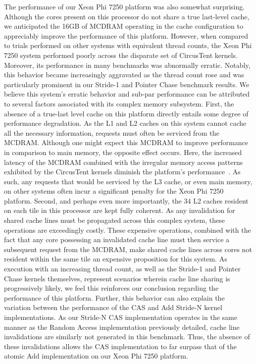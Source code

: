 The performance of our Xeon Phi 7250 platform was also somewhat surprising.
Although the cores present on this processor do not share a true last-level cache, we anticipated the 16GB of MCDRAM operating in the cache configuration to appreciably improve the performance of this platform.
However, when compared to trials performed on other systems with equivalent thread counts, the Xeon Phi 7250 system performed poorly across the disparate set of CircusTent kernels.
Moreover, its performance in many benchmarks was abnormally erratic.
Notably, this behavior became increasingly aggravated as the thread count rose and was particularly prominent in our Stride-1 and Pointer Chase benchmark results.
We believe this system's erratic behavior and sub-par performance can be attributed to several factors associated with its complex memory subsystem.
First, the absence of a true-last level cache on this platform directly entails some degree of performance degradation.
As the L1 and L2 caches on this system cannot cache all the necessary information, requests must often be serviced from the MCDRAM.
Although one might expect this MCDRAM to improve performance in comparison to main memory, the opposite effect occurs.
Here, the increased latency of the MCDRAM combined with the irregular memory access patterns exhibited by the CircusTent kernels diminish the platform's performance~\cite{peng2017exploring}.
As such, any requests that would be serviced by the L3 cache, or even main memory, on other systems often incur a significant penalty for the Xeon Phi 7250 platform.
Second, and perhaps even more importantly, the 34 L2 caches resident on each tile in this processor are kept fully coherent.
As any invalidation for shared cache lines must be propagated across this complex system, these operations are exceedingly costly.
These expensive operations, combined with the fact that any core possessing an invalidated cache line must then service a subsequent request from the MCDRAM, make shared cache lines across cores not resident within the same tile an expensive proposition for this system.
As execution with an increasing thread count, as well as the Stride-1 and Pointer Chase kernels themselves, represent scenarios wherein cache line sharing is progressively likely, we feel this reinforces our conclusion regarding the performance of this platform.
Further, this behavior can also explain the variation between the performance of the CAS and Add Stride-N kernel implementations.
As our Stride-N CAS implementation operates in the same manner as the Random Access implementation previously detailed, cache line invalidations are similarly not generated in this benchmark.
Thus, the absence of these invalidations allows the CAS implementation to far surpass that of the atomic Add implementation on our Xeon Phi 7250 platform.

